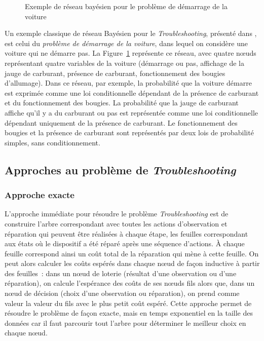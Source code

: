 \documentclass[a4paper,11pt]{article}
\theoremstyle{plain}
\begin{document}
\begin{figure}[ht]
\centering
{}
\caption{Exemple de réseau bayésien pour le problème de démarrage de la voiture}%
\label{FigExplBayesien}%
\end{figure}

Un exemple classique de réseau Bayésien pour le \emph{Troubleshooting}, présenté dans \cite{Jensen_2007}, est celui du \emph{problème de démarrage de la voiture}, dans lequel on considère une voiture qui ne démarre pas. La Figure~\ref{FigExplBayesien} représente ce réseau, avec quatre nœuds représentant quatre variables de la voiture (démarrage ou pas, affichage de la jauge de carburant, présence de carburant, fonctionnement des bougies d'allumage). Dans ce réseau, par exemple, la probabilité que la voiture démarre est exprimée comme une loi conditionnelle dépendant de la présence de carburant et du fonctionnement des bougies. La probabilité que la jauge de carburant affiche qu'il y a du carburant ou pas est représentée comme une loi conditionnelle dépendant uniquement de la présence de carburant. Le fonctionnement des bougies et la présence de carburant sont représentés par deux lois de probabilité simples, sans conditionnement.

\subsection{Approches au problème de \emph{Troubleshooting}}

\subsubsection{Approche exacte}

L'approche immédiate pour résoudre le problème \emph{Troubleshooting} est de construire l'arbre correspondant avec toutes les actions d'observation et réparation qui peuvent être réalisées à chaque étape, les feuilles correspondant aux états où le dispositif a été réparé après une séquence d'actions. À chaque feuille correspond ainsi un coût total de la réparation qui mène à cette feuille. On peut alors calculer les coûts espérés dans chaque nœud de façon inductive à partir des feuilles~: dans un nœud de loterie (résultat d'une observation ou d'une réparation), on calcule l'espérance des coûts de ses nœuds fils alors que, dans un nœud de décision (choix d'une observation ou réparation), on prend comme valeur la valeur du fils avec le plus petit coût espéré. Cette approche permet de résoudre le problème de façon exacte, mais en temps exponentiel en la taille des données car il faut parcourir tout l'arbre pour déterminer le meilleur choix en chaque nœud.
\end{document}
